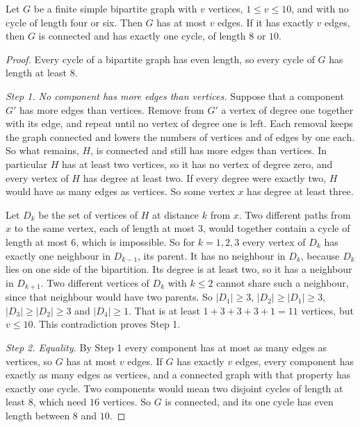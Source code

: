 \begin{lemma}\label{lem:tenvertices}
Let $G$ be a finite simple bipartite graph with $v$ vertices, $1\le v\le10$, and with no cycle
of length four or six. Then $G$ has at most $v$ edges. If it has exactly $v$ edges, then $G$ is
connected and has exactly one cycle, of length $8$ or $10$.
\end{lemma}

\begin{proof}
Every cycle of a bipartite graph has even length, so every cycle of $G$ has length at least
$8$.

\emph{Step 1. No component has more edges than vertices.} Suppose that a component $G'$ has
more edges than vertices. Remove from $G'$ a vertex of degree one together with its edge, and
repeat until no vertex of degree one is left. Each removal keeps the graph connected and lowers
the numbers of vertices and of edges by one each. So what remains, $H$, is connected and still
has more edges than vertices. In particular $H$ has at least two vertices, so it has no vertex
of degree zero, and every vertex of $H$ has degree at least two. If every degree were exactly
two, $H$ would have as many edges as vertices. So some vertex $x$ has degree at least three.

Let $D_k$ be the set of vertices of $H$ at distance $k$ from $x$. Two different paths from
$x$ to the same vertex, each of length at most $3$, would together contain a cycle of length
at most $6$, which is impossible. So for $k=1,2,3$ every vertex of $D_k$ has exactly one
neighbour in $D_{k-1}$, its parent. It has no neighbour in $D_k$, because $D_k$ lies on one
side of the bipartition. Its degree is at least two, so it has a neighbour in $D_{k+1}$. Two
different vertices of $D_k$ with $k\le2$ cannot share such a neighbour, since that neighbour
would have two parents. So $|D_1|\ge3$, $|D_2|\ge|D_1|\ge3$, $|D_3|\ge|D_2|\ge3$ and
$|D_4|\ge1$. That is at least $1+3+3+3+1=11$ vertices, but $v\le10$. This contradiction
proves Step 1.

\emph{Step 2. Equality.} By Step 1 every component has at most as many edges as vertices, so
$G$ has at most $v$ edges. If $G$ has exactly $v$ edges, every component has exactly as many
edges as vertices, and a connected graph with that property has exactly one cycle. Two
components would mean two disjoint cycles of length at least $8$, which need $16$ vertices.
So $G$ is connected, and its one cycle has even length between $8$ and $10$.
\end{proof}

